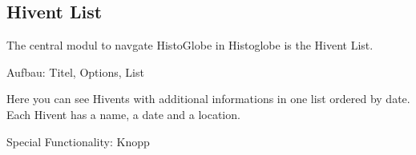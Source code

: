 \subsection{Hivent List}
The central modul to navgate HistoGlobe in Histoglobe is the Hivent List. 

Aufbau: Titel, Options, List

Here you can see Hivents with additional informations in one list ordered by date.
Each Hivent has a name, a date and a location.

Special Functionality: Knopp